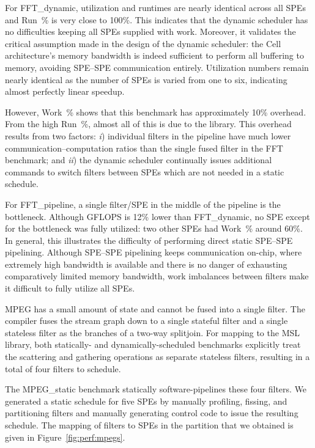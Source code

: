 For \textsf{FFT\_dynamic}, utilization and runtimes are nearly identical across all SPEs and Run~\% is very close to 100\%. This indicates that the dynamic scheduler has no difficulties keeping all SPEs supplied with work. Moreover, it validates the critical assumption made in the design of the dynamic scheduler: the Cell architecture's memory bandwidth is indeed sufficient to perform all buffering to memory, avoiding SPE--SPE communication entirely. Utilization numbers remain nearly identical as the number of SPEs is varied from one to six, indicating almost perfectly linear speedup. 

However, Work~\% shows that this benchmark has approximately 10\% overhead. From the high Run~\%, almost all of this is due to the library. This overhead results from two factors: \emph{i}) individual filters in the pipeline have much lower communication--computation ratios than the single fused filter in the \textsf{FFT} benchmark; and \emph{ii}) the dynamic scheduler continually issues additional commands to switch filters between SPEs which are not needed in a static schedule.

For \textsf{FFT\_pipeline}, a single filter/SPE in the middle of the pipeline is the bottleneck. Although GFLOPS is 12\% lower than \textsf{FFT\_dynamic}, no SPE except for the bottleneck was fully utilized: two other SPEs had Work~\% around 60\%. In general, this illustrates the difficulty of performing direct static SPE--SPE pipelining. Although SPE--SPE pipelining keeps communication on-chip, where extremely high bandwidth is available and there is no danger of exhausting comparatively limited memory bandwidth, work imbalances between filters make it difficult to fully utilize all SPEs.

MPEG has a small amount of state and cannot be fused into a single filter. The compiler fuses the stream graph down to a single stateful filter and a single stateless filter as the branches of a two-way splitjoin. For mapping to the MSL library, both statically- and dynamically-scheduled benchmarks explicitly treat the scattering and gathering operations as separate stateless filters, resulting in a total of four filters to schedule.

The \textsf{MPEG\_static} benchmark statically software-pipelines these four filters. We generated a static schedule for five SPEs by manually profiling, fissing, and partitioning filters and manually generating control code to issue the resulting schedule. The mapping of filters to SPEs in the partition that we obtained is given in Figure~\ref{fig:perf:mpegs}.

